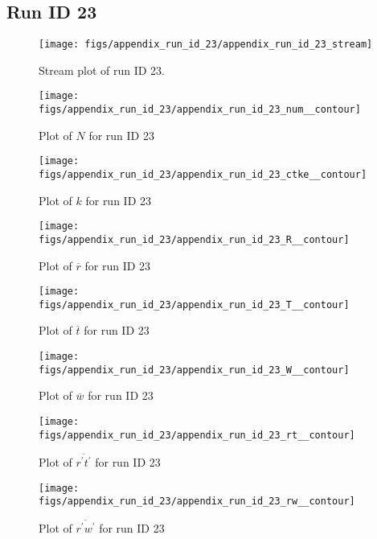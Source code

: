 \subsection{Run ID 23}
\begin{figure}[H]
\centering
\texttt{[image: figs/appendix\_run\_id\_23/appendix\_run\_id\_23\_stream]}
\caption{Stream plot of run ID 23.}
\label{fig:appendix_run_id_23_stream}
\end{figure}


\begin{figure}[H]
\centering
\texttt{[image: figs/appendix\_run\_id\_23/appendix\_run\_id\_23\_num\_\_contour]}
\caption{Plot of $N$ for run ID 23}
\label{fig:appendix_run_id_23_num__contour}
\end{figure}


\begin{figure}[H]
\centering
\texttt{[image: figs/appendix\_run\_id\_23/appendix\_run\_id\_23\_ctke\_\_contour]}
\caption{Plot of $k$ for run ID 23}
\label{fig:appendix_run_id_23_ctke__contour}
\end{figure}


\begin{figure}[H]
\centering
\texttt{[image: figs/appendix\_run\_id\_23/appendix\_run\_id\_23\_R\_\_contour]}
\caption{Plot of $\overline{r}$ for run ID 23}
\label{fig:appendix_run_id_23_R__contour}
\end{figure}


\begin{figure}[H]
\centering
\texttt{[image: figs/appendix\_run\_id\_23/appendix\_run\_id\_23\_T\_\_contour]}
\caption{Plot of $\overline{t}$ for run ID 23}
\label{fig:appendix_run_id_23_T__contour}
\end{figure}


\begin{figure}[H]
\centering
\texttt{[image: figs/appendix\_run\_id\_23/appendix\_run\_id\_23\_W\_\_contour]}
\caption{Plot of $\overline{w}$ for run ID 23}
\label{fig:appendix_run_id_23_W__contour}
\end{figure}


\begin{figure}[H]
\centering
\texttt{[image: figs/appendix\_run\_id\_23/appendix\_run\_id\_23\_rt\_\_contour]}
\caption{Plot of $\overline{r^\prime t^\prime}$ for run ID 23}
\label{fig:appendix_run_id_23_rt__contour}
\end{figure}


\begin{figure}[H]
\centering
\texttt{[image: figs/appendix\_run\_id\_23/appendix\_run\_id\_23\_rw\_\_contour]}
\caption{Plot of $\overline{r^\prime w^\prime}$ for run ID 23}
\label{fig:appendix_run_id_23_rw__contour}
\end{figure}



